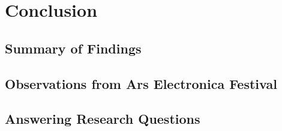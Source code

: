 \chapter{Conclusion}
    \section{Summary of Findings}
    \section{Observations from Ars Electronica Festival}
    \section{Answering Research Questions}